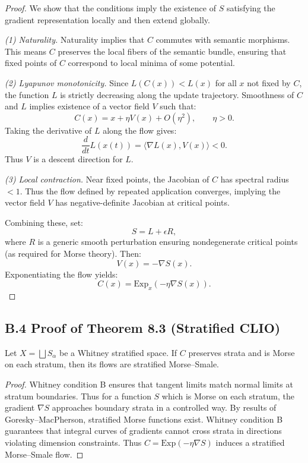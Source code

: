 \documentclass[11pt,a4paper,twocolumn]{article}
\begin{document}
\begin{proof}
We show that the conditions imply the existence of $S$ satisfying the
gradient representation locally and then extend globally.

\textit{(1) Naturality.}
Naturality implies that $C$ commutes with semantic morphisms.
This means $C$ preserves the local fibers of the semantic bundle,
ensuring that fixed points of $C$ correspond to local minima of some
potential.

\textit{(2) Lyapunov monotonicity.}
Since $L(C(x)) < L(x)$ for all $x$ not fixed by $C$, the function $L$ is
strictly decreasing along the update trajectory. Smoothness of $C$ and
$L$ implies existence of a vector field $V$ such that:
\[
C(x) = x + \eta V(x) + O(\eta^2), \qquad \eta > 0.
\]
Taking the derivative of $L$ along the flow gives:
\[
\frac{d}{dt}L(x(t))
= \langle \nabla L(x), V(x) \rangle < 0.
\]
Thus $V$ is a descent direction for $L$.

\textit{(3) Local contraction.}
Near fixed points, the Jacobian of $C$ has spectral radius $<1$.
Thus the flow defined by repeated application converges, implying the
vector field $V$ has negative-definite Jacobian at critical points.

Combining these, set:
\[
S = L + \epsilon R,
\]
where $R$ is a generic smooth perturbation ensuring nondegenerate
critical points (as required for Morse theory).
Then:
\[
V(x) = -\nabla S(x).
\]
Exponentiating the flow yields:
\[
C(x) = \mathrm{Exp}_x(-\eta \nabla S(x)).
\]
\end{proof}


\subsection*{B.4 Proof of Theorem 8.3 (Stratified CLIO)}

\begin{theorem*}
Let $X = \bigsqcup S_\alpha$ be a Whitney stratified space.
If $C$ preserves strata and is Morse on each stratum,
then its flows are stratified Morse–Smale.
\end{theorem*}

\begin{proof}
Whitney condition B ensures that tangent limits match normal limits at
stratum boundaries. Thus for a function $S$ which is Morse on each
stratum, the gradient $\nabla S$ approaches boundary strata in a
controlled way.
By results of Goresky–MacPherson, stratified Morse functions exist.
Whitney condition B guarantees that integral curves of gradients cannot
cross strata in directions violating dimension constraints.
Thus $C = \mathrm{Exp}(-\eta\nabla S)$ induces a stratified
Morse–Smale flow.
\end{proof}
\end{document}
